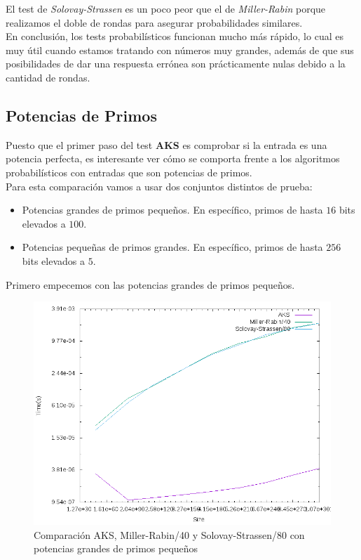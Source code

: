 El test de \textit{Solovay-Strassen} es un poco peor que el de \textit{Miller-Rabin} porque realizamos el doble de rondas para asegurar probabilidades similares.\\

En conclusión, los tests probabilísticos funcionan mucho más rápido, lo cual es muy útil cuando estamos tratando con números muy grandes, además de que sus posibilidades de dar una respuesta errónea son prácticamente nulas debido a la cantidad de rondas.

\subsection{Potencias de Primos}

Puesto que el primer paso del test \textbf{AKS} es comprobar si la entrada es una potencia perfecta, es interesante ver cómo se comporta frente a los algoritmos probabilísticos con entradas que son potencias de primos.\\

Para esta comparación vamos a usar dos conjuntos distintos de prueba:

\begin{itemize}
	\item Potencias grandes de primos pequeños. En específico, primos de hasta $16$ bits elevados a $100$.
	
	\item Potencias pequeñas de primos grandes. En específico, primos de hasta $256$ bits elevados a $5$.
\end{itemize}

Primero empecemos con las potencias grandes de primos pequeños.

\begin{figure}[H]
	\centering
	\includegraphics[totalheight=12cm]{img/graphs/aks-probs-powers-100-mean}
	\caption{Comparación AKS, Miller-Rabin/40 y Solovay-Strassen/80 con potencias grandes de primos pequeños}
\end{figure}


